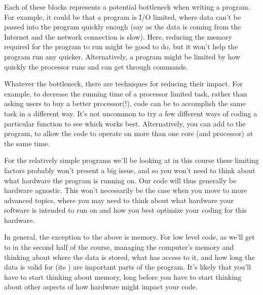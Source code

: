 \documentclass[letterpaper,10pt,british]{sphinxmanual}
\let\sphinxpxdimen\pdfpxdimen\else\newdimen\sphinxpxdimen
\begin{document}
\begin{figure}[htbp]
\centering

\noindent\sphinxincludegraphics[width=700\sphinxpxdimen]{{computer_parts}.png}
\end{figure}

\sphinxAtStartPar
Each of these blocks represents a potential bottleneck when writing a program. For example, it could be that a program is I/O limited, where data can’t be passed into the program quickly enough (say as the data is coming from the Internet and the network connection is slow). Here, reducing the memory required for the program to run might be good to do, but it won’t help the program run any quicker. Alternatively, a program might be limited by how quickly the processor runs and can get through commands.

\sphinxAtStartPar
Whatever the bottleneck, there are techniques for reducing their impact. For example, to decrease the running time of a processor limited task, rather than asking users to buy a better processor(!), code can be  to accomplish the same task in a different way. It’s not uncommon to try a few different ways of coding a particular function to see which works best. Alternatively, you can add  to the program, to allow the code to operate on more than one core (and processor) at the same time.

\sphinxAtStartPar
For the relatively simple programs we’ll be looking at in this course these limiting factors probably won’t present a big issue, and so you won’t need to think about what hardware the program is running on. Our code will thus generally be hardware agnostic. This won’t necessarily be the case when you move to more advanced topics, where you may need to think about what hardware your software is intended to run on and how you best optimize your coding for this hardware.

\sphinxAtStartPar
In general, the exception to the above is memory. For low level code, as we’ll get to in the second half of the course, managing the computer’s memory and thinking about where the data is stored, what has access to it, and how long the data is valid for (its ) are important parts of the program. It’s likely that you’ll have to start thinking about memory, long before you have to start thinking about other aspects of how hardware might impact your code.

\sphinxstepscope
\end{document}
